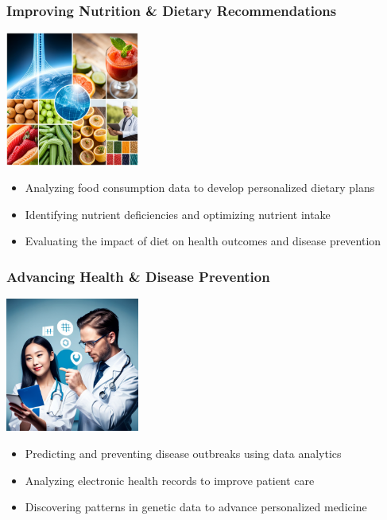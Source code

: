 \documentclass{beamer}
\begin{document}
    \begin{frame}
        \frametitle{Improving Nutrition \& Dietary Recommendations}
        \begin{center}
            \includegraphics[width=0.33\textwidth]{figures/nutrition-data-science}
        \end{center}
        \begin{itemize}
            \item Analyzing food consumption data to develop personalized dietary plans
            \item Identifying nutrient deficiencies and optimizing nutrient intake
            \item Evaluating the impact of diet on health outcomes and disease prevention
        \end{itemize}
    \end{frame}
        
    \begin{frame}
        \frametitle{Advancing Health \& Disease Prevention}
        \begin{center}
            \includegraphics[width=0.33\textwidth]{figures/healthcare-data-science.png}
        \end{center}
        \begin{itemize}
            \item Predicting and preventing disease outbreaks using data analytics
            \item Analyzing electronic health records to improve patient care
            \item Discovering patterns in genetic data to advance personalized medicine
        \end{itemize}
    \end{frame}
        
\end{document}
